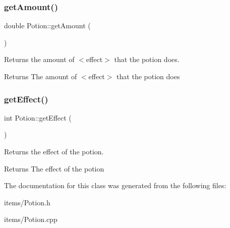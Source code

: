 \subsubsection{\texorpdfstring{getAmount()}{getAmount()}}
{\footnotesize\ttfamily double Potion\+::get\+Amount (\begin{DoxyParamCaption}{ }\end{DoxyParamCaption})}



Returns the amount of $<$effect$>$ that the potion does. 

\begin{DoxyReturn}{Returns}
The amount of $<$effect$>$ that the potion does 
\end{DoxyReturn}
\mbox{\label{class_potion_abd59ead47388b4e6bf7ce3a11a6f4d27}} 
\subsubsection{\texorpdfstring{getEffect()}{getEffect()}}
{\footnotesize\ttfamily int Potion\+::get\+Effect (\begin{DoxyParamCaption}{ }\end{DoxyParamCaption})}



Returns the effect of the potion. 

\begin{DoxyReturn}{Returns}
The effect of the potion 
\end{DoxyReturn}


The documentation for this class was generated from the following files\+:\begin{DoxyCompactItemize}
\item 
items/Potion.\+h\item 
items/Potion.\+cpp\end{DoxyCompactItemize}
